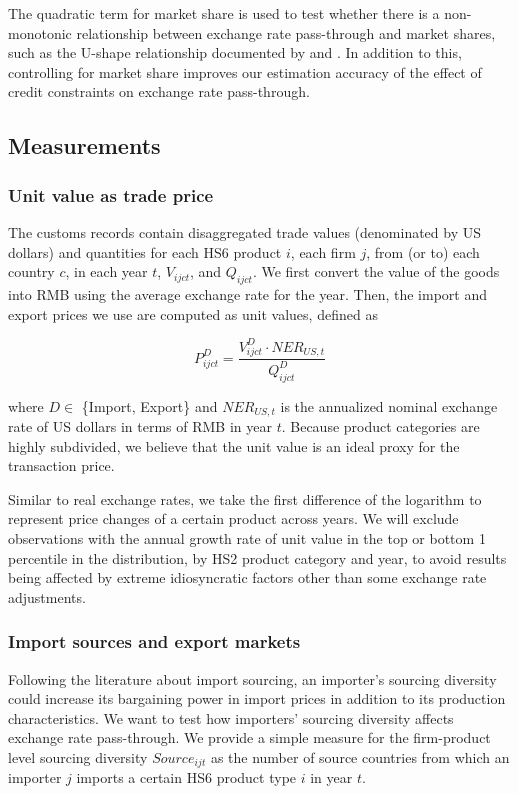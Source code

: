 \documentclass[12pt]{article}
\begin{document}
The quadratic term for market share is used to test whether there is a non-monotonic relationship between exchange rate pass-through and market shares, such as the U-shape relationship documented by \cite{garetto2016} and \cite{devereux2017}. In addition to this, controlling for market share improves our estimation accuracy of the effect of credit constraints on exchange rate pass-through.

\subsection{Measurements} \label{Framework-Measurements}

\subsubsection{Unit value as trade price}

The customs records contain disaggregated trade values (denominated by US dollars) and quantities for each HS6 product $i$, each firm $j$, from (or to) each country $c$, in each year $t$, $V_{ijct}$, and $Q_{ijct}$. We first convert the value of the goods into RMB using the average exchange rate for the year. Then, the import and export prices we use are computed as unit values, defined as 

$$
P^{D}_{ijct}=\frac{V^{D}_{ijct}\cdot NER_{US,t}}{Q^{D}_{ijct}}
$$

where $D \in$ \{Import, Export\} and $NER_{US,t}$ is the annualized nominal exchange rate of US dollars in terms of RMB in year $t$. Because product categories are highly subdivided, we believe that the unit value is an ideal proxy for the transaction price.

Similar to real exchange rates, we take the first difference of the logarithm to represent price changes of a certain product across years. We will exclude observations with the annual growth rate of unit value in the top or bottom 1 percentile in the distribution, by HS2 product category and year, to avoid results being affected by extreme idiosyncratic factors other than some exchange rate adjustments.

\subsubsection{Import sources and export markets}
Following the literature about import sourcing, an importer's sourcing diversity could increase its bargaining power in import prices in addition to its production characteristics. We want to test how importers' sourcing diversity affects exchange rate pass-through. We provide a simple measure for the firm-product level sourcing diversity $Source_{ijt}$ as the number of source countries from which an importer $j$ imports a certain HS6 product type $i$ in year $t$. 
\end{document}
